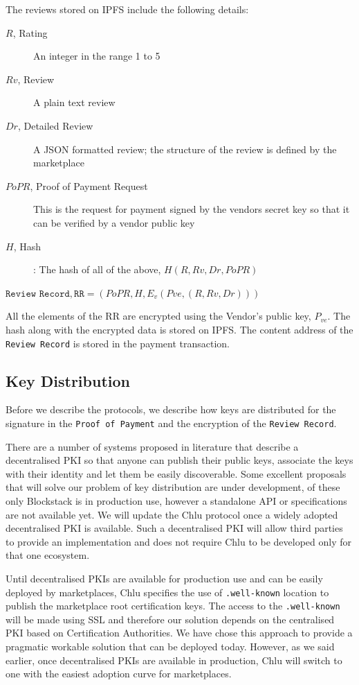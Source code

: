 \documentclass[a4paper]{article}
\begin{document}
The reviews stored on IPFS include the following details: 

\begin{description}
\item[$R$, Rating] An integer in the range 1 to 5
\item[$Rv$, Review] A plain text review
\item[$Dr$, Detailed Review] A JSON formatted review; the structure of
  the review is defined by the marketplace
\item[$PoPR$, Proof of Payment Request] This is the request for
  payment signed by the vendors secret key so that it can be verified
  by a vendor public key
\item[$H$, Hash]: The hash of all of the above, $H(R, Rv, Dr, PoPR)$
\end{description}

$\texttt{Review Record}, \texttt{RR} = (PoPR, H, E_v(Pve, (R, Rv, Dr)))$

All the elements of the RR are encrypted using the Vendor's public key,
$P_{ve}$.  The hash along with the encrypted data is stored on IPFS\@. The
content address of the \texttt{Review Record} is stored in the payment
transaction.

\subsection{Key Distribution}\label{sec:key-distribution}

Before we describe the protocols, we describe how keys are distributed
for the signature in the \texttt{Proof of Payment} and the encryption
of the \texttt{Review Record}.

There are a number of systems proposed in literature that describe a
decentralised PKI so that anyone can publish their public keys,
associate the keys with their identity and let them be easily
discoverable. Some excellent proposals that will solve our problem of
key distribution are under
development\cite{blockstack,fromknecht2014decentralized,kulynychdecentralizing,rwot-dpki,IKP,morselli2006keychains},
of these only Blockstack is in production use, however a standalone
API or specifications are not available yet. We will update the Chlu
protocol once a widely adopted decentralised PKI is available. Such a
decentralised PKI will allow third parties to provide an
implementation and does not require Chlu to be developed only for that
one ecosystem.

Until decentralised PKIs are available for production use and can be
easily deployed by marketplaces, Chlu specifies the use of
\texttt{.well-known}\cite{wellknown} location to publish the
marketplace root certification keys. The access to the
\texttt{.well-known} will be made using SSL and therefore our solution
depends on the centralised PKI based on Certification Authorities. We
have chose this approach to provide a pragmatic workable solution that
can be deployed today. However, as we said earlier, once decentralised
PKIs are available in production, Chlu will switch to one with the
easiest adoption curve for marketplaces.
\end{document}
